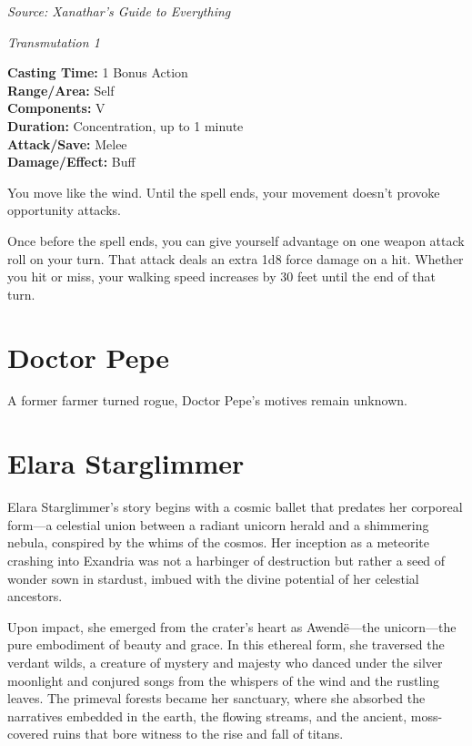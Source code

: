 \documentclass[
  letterpaper,12pt,twoside,twocolumn,openany,
  nodeprecatedcode,bg=full]{dndbook}
\begin{document}
\emph{Source: Xanathar's Guide to Everything}

\emph{Transmutation 1}

\textbf{Casting Time:} 1 Bonus Action\\
\textbf{Range/Area:} Self\\
\textbf{Components:} V\\
\textbf{Duration:} Concentration, up to 1 minute\\
\textbf{Attack/Save:} Melee\\
\textbf{Damage/Effect:} Buff

You move like the wind. Until the spell ends, your movement doesn't
provoke opportunity attacks.

Once before the spell ends, you can give yourself advantage on one
weapon attack roll on your turn. That attack deals an extra 1d8 force
damage on a hit. Whether you hit or miss, your walking speed increases
by 30 feet until the end of that turn.

\chapter{Doctor Pepe}\label{doctor-pepe-1}

A former farmer turned rogue, Doctor Pepe's motives remain unknown.

\chapter{Elara Starglimmer}\label{elara-starglimmer}

Elara Starglimmer's story begins with a cosmic ballet that predates her
corporeal form---a celestial union between a radiant unicorn herald and
a shimmering nebula, conspired by the whims of the cosmos. Her inception
as a meteorite crashing into Exandria was not a harbinger of destruction
but rather a seed of wonder sown in stardust, imbued with the divine
potential of her celestial ancestors.

Upon impact, she emerged from the crater's heart as Awendë---the
unicorn---the pure embodiment of beauty and grace. In this ethereal
form, she traversed the verdant wilds, a creature of mystery and majesty
who danced under the silver moonlight and conjured songs from the
whispers of the wind and the rustling leaves. The primeval forests
became her sanctuary, where she absorbed the narratives embedded in the
earth, the flowing streams, and the ancient, moss-covered ruins that
bore witness to the rise and fall of titans.
\end{document}
